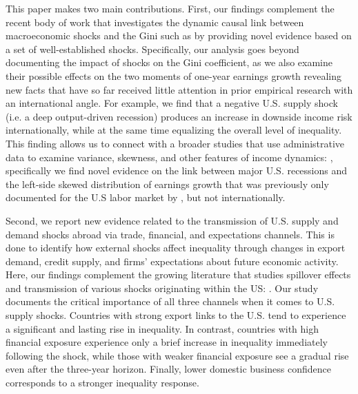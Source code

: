 \documentclass[12pt, a4paper]{article}
\begin{document}
This paper makes two main contributions. First, our findings complement the recent body of work that investigates the dynamic causal link between macroeconomic shocks and the Gini such as \textcite{coibion2017innocent, Davtyan2017, furceri2018effects} by providing novel evidence based on a set of well-established shocks. Specifically, our analysis goes beyond documenting the impact of shocks on the Gini coefficient, as we also examine their possible effects on the two moments of one-year earnings growth revealing new facts that have so far received little attention in prior empirical research with an international angle. For example, we find that a negative U.S. supply shock (i.e. a deep output-driven recession) produces an increase in downside income risk internationally, while at the same time equalizing the overall level of inequality. This finding allows us to connect with a broader studies that use administrative data to examine variance, skewness, and other features of income dynamics: \textcite{guvenen2014nature, hoffmann2019employment, busch2018asymmetric}, specifically we find novel evidence on the link between major U.S. recessions and the left-side skewed distribution of earnings growth that was previously only documented for the U.S labor market by \textcite{guvenen2014nature}, but not internationally. 

Second, we report new evidence related to the transmission of U.S. supply and demand shocks abroad via trade, financial, and expectations channels. This is done to identify how external shocks affect inequality through changes in export demand, credit supply, and firms' expectations about future economic activity. Here, our findings complement the growing literature that studies spillover effects and transmission of various shocks originating within the US: \textcite{canova2005transmission, mackowiak2007external, akinci2013global, bowman2015us, dedola2017if, carrillo2020inquiry, levchenko2020tfp, di2022international, azad2022spillovers, lastauskas2023global, lastaukas2024}. Our study documents the critical importance of all three channels when it comes to U.S. supply shocks. Countries with strong export links to the U.S. tend to experience a significant and lasting rise in inequality. In contrast, countries with high financial exposure experience only a brief increase in inequality immediately following the shock, while those with weaker financial exposure see a gradual rise even after the three-year horizon. Finally, lower domestic business confidence corresponds to a stronger inequality response.
\end{document}
